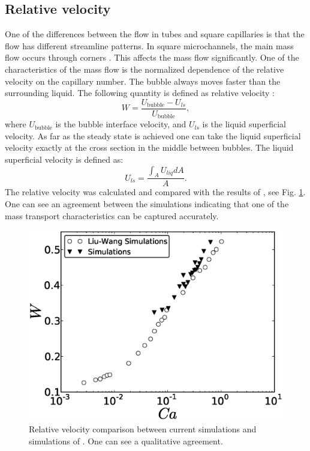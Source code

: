 \documentclass[preprint,12pt]{elsarticle}
\begin{document}
\subsection{Relative velocity}
One of the differences between the flow in tubes and square capillaries is that the flow has
different streamline patterns. In square microchannels, the main mass flow occurs through corners
\cite{heil-threedim,wang-non-circular}. This affects the mass flow significantly. One of the
characteristics of the mass flow is the normalized dependence of the relative velocity on the
capillary
number. The bubble always moves faster than the surrounding liquid. The following quantity is
defined as
relative velocity \cite{cerro-bubble-train}:
\begin{equation}
W=\frac{U_{\mathrm{bubble}}-U_{ls}}{U_{\mathrm{bubble}}},
\end{equation}
where $U_{\mathrm{bubble}}$ is the bubble interface velocity, and $U_{ls}$ is the liquid superficial
velocity. As far as the steady state is achieved one can take the liquid superficial velocity
exactly at the cross section in the middle between bubbles. The liquid superficial velocity is
defined as:
\begin{equation}
U_{ls}=\frac{\int_{A}{U_{liq}dA}}{A}.
\end{equation}
The relative velocity was calculated and compared with the results of \citet{wang-non-circular},
see Fig. \ref{fig:relative:velocity}. One can see an agreement between the simulations indicating
that
one of the mass transport characteristics can be captured accurately. 
\begin{figure}[ht]
\includegraphics[width=\textwidth]{relative_velocity.eps}
\caption{Relative velocity comparison between current simulations and simulations of
\citet{wang-non-circular}. One can see a qualitative agreement. \label{fig:relative:velocity}}
\end{figure}
\end{document}
